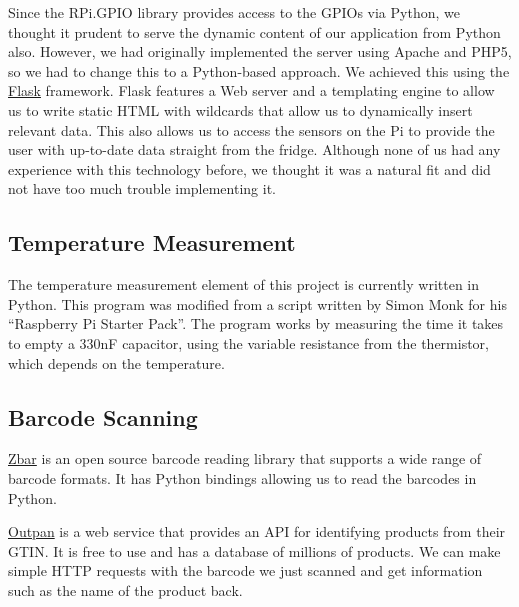 \documentclass[10pt]{article}
\begin{document}
{{Since the RPi.GPIO library provides access to the GPIOs via Python, we thought it prudent to serve the dynamic content of our application from Python also. However, we had originally implemented the server using Apache and PHP5, so we had to change this to a Python-based approach. We achieved this using the \href{http://flask.pocoo.org/}{Flask} framework. Flask features a Web server and a templating engine to allow us to write static HTML with wildcards that allow us to dynamically insert relevant data. This also allows us to access the sensors on the Pi to provide the user with up-to-date data straight from the fridge. Although none of us had any experience with this technology before, we thought it was a natural fit and did not have too much trouble implementing it.

\subsection{Temperature Measurement}

The temperature measurement element of this project is currently written in Python. This program was modified from a script written by Simon Monk for his ``Raspberry Pi Starter Pack''. The program works by measuring the time it takes to empty a 330nF capacitor, using the variable resistance from the thermistor, which depends on the temperature. 

\newpage
\subsection{Barcode Scanning}

\href{http://zbar.sourceforge.net/}{Zbar} is an open source barcode reading library that supports a wide range of barcode formats. It has Python bindings allowing us to read the barcodes in Python.



\href{https://www.outpan.com/}{Outpan} is a web service that provides an API for identifying products from their GTIN. It is free to use and has a database of millions of products. We can make simple HTTP requests with the barcode we just scanned and get information such as the name of the product back.

}}
\end{document}
